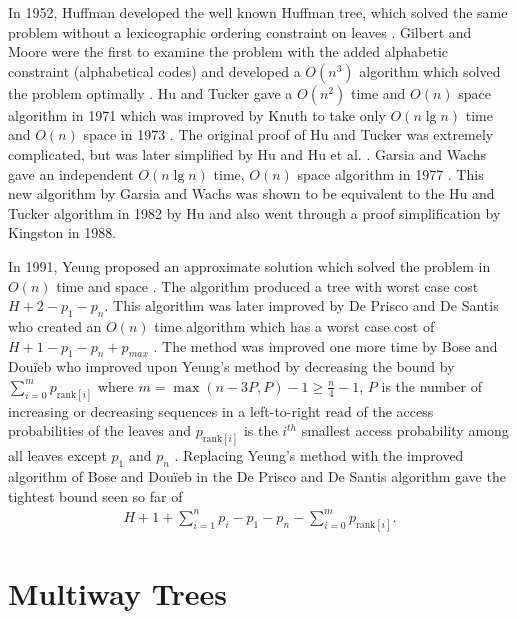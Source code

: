 \documentclass[letterpaper,12pt,titlepage,oneside,final]{book}
\theoremstyle{plain}
\begin{document}
In 1952, Huffman developed the well known Huffman tree, which solved the same problem without a lexicographic ordering constraint on leaves \cite{huffman1952method}. Gilbert and Moore were the first to examine the problem with the added alphabetic constraint (alphabetical codes) and developed a $O(n^3)$ algorithm which solved the problem optimally \cite{gilbert1959variable}. Hu and Tucker gave a $O(n^2)$ time and $O(n)$ space algorithm in 1971 \cite{hu1971optimal} which was improved by Knuth to take only $O(n \lg n)$ time and $O(n)$ space in 1973 \cite{knuth1973sorting}. The original proof of Hu and Tucker was extremely complicated, but was later simplified by Hu \cite{hu1973new} and Hu et al. \cite{hu1979binary}. Garsia and Wachs gave an independent $O(n \lg n)$ time, $O(n)$ space algorithm in 1977 \cite{garsia1977new}. This new algorithm by Garsia and Wachs was shown to be equivalent to the Hu and Tucker algorithm in 1982 by Hu \cite{Hu1982Book} and also went through a proof simplification \cite{kingston1988new} by Kingston in 1988.

In 1991, Yeung proposed an approximate solution which solved the problem in $O(n)$ time and space \cite{yeung1991alphabetic}. The algorithm produced a tree with worst case cost $H + 2 - p_1-p_n$. This algorithm was later improved by De Prisco and De Santis who created an $O(n)$ time algorithm which has a worst case cost of $H+1-p_1-p_n+p_{max}$ \cite{de1993binary}. The method was improved one more time by Bose and Dou\"{i}eb who improved upon Yeung's method by decreasing the bound by $\sum_{i=0}^m p_{\text{rank}[i]}$ where $m=\max({n-3P,P})-1 \geq \frac{n}{4} - 1$, $P$ is the number of increasing or decreasing sequences in a left-to-right read of the access probabilities of the leaves and $p_{\text{rank}[i]}$ is the $i^{th}$ smallest access probability among all leaves except $p_1$ and $p_n$ \cite{bose2009efficient}. Replacing Yeung's method with the improved algorithm of Bose and Dou\"{i}eb in the De Prisco and De Santis algorithm gave the tightest bound seen so far of 
\begin{align*}
H+1+\sum_{i=1}^{n}p_i-p_1-p_n-\sum_{i=0}^m p_{\text{rank}[i]}. 
\end{align*}

\section{Multiway Trees} \label{sec:MWT}
\end{document}

